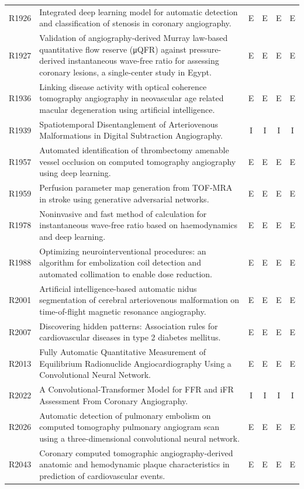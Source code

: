 \begin{longtable}{@{}l p{8.6cm} c c c c@{}}
R1926 & Integrated deep learning model for automatic detection and classification of stenosis in coronary angiography. & E & E & E & E \\
R1927 & Validation of angiography-derived Murray law-based quantitative flow reserve (μQFR) against pressure-derived instantaneous wave-free ratio for assessing coronary lesions, a single-center study in Egypt. & E & E & E & E \\
R1936 & Linking disease activity with optical coherence tomography angiography in neovascular age related macular degeneration using artificial intelligence. & E & E & E & E \\
R1939 & Spatiotemporal Disentanglement of Arteriovenous Malformations in Digital Subtraction Angiography. & I & I & I & I \\
R1957 & Automated identification of thrombectomy amenable vessel occlusion on computed tomography angiography using deep learning. & E & E & E & E \\
R1959 & Perfusion parameter map generation from TOF-MRA in stroke using generative adversarial networks. & E & E & E & E \\
R1978 & Noninvasive and fast method of calculation for instantaneous wave-free ratio based on haemodynamics and deep learning. & E & E & E & E \\
R1988 & Optimizing neurointerventional procedures: an algorithm for embolization coil detection and automated collimation to enable dose reduction. & E & E & E & E \\
R2001 & Artificial intelligence-based automatic nidus segmentation of cerebral arteriovenous malformation on time-of-flight magnetic resonance angiography. & E & E & E & E \\
R2007 & Discovering hidden patterns: Association rules for cardiovascular diseases in type 2 diabetes mellitus. & E & E & E & E \\
R2013 & Fully Automatic Quantitative Measurement of Equilibrium Radionuclide Angiocardiography Using a Convolutional Neural Network. & E & E & E & E \\
R2022 & A Convolutional-Transformer Model for FFR and iFR Assessment From Coronary Angiography. & I & I & I & I \\
R2026 & Automatic detection of pulmonary embolism on computed tomography pulmonary angiogram scan using a three-dimensional convolutional neural network. & E & E & E & E \\
R2043 & Coronary computed tomographic angiography-derived anatomic and hemodynamic plaque characteristics in prediction of cardiovascular events. & E & E & E & E \\

\end{longtable}
